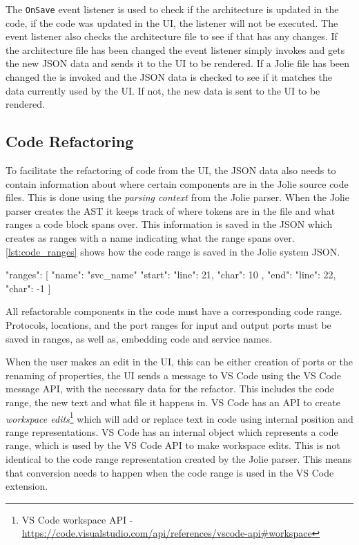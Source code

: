 The \texttt{OnSave} event listener is used to check if the architecture is updated in the code, if the code was updated in the UI, the listener will not be executed. The event listener also checks the architecture file to see if that has any changes.
If the architecture file has been changed the event listener simply invokes \nodetoolname[] and gets the new JSON data and sends it to the UI to be rendered.
If a Jolie file has been changed the \nodetoolname[] is invoked and the JSON data is checked to see if it matches the data currently used by the UI. If not, the new data is sent to the UI to be rendered.

\subsection{Code Refactoring}
To facilitate the refactoring of code from the UI, the JSON data also needs to contain information about where certain components are in the Jolie source code files.
This is done using the \emph{parsing context} from the Jolie parser. When the Jolie parser creates the AST it keeps track of where tokens are in the file and what ranges a code block spans over.
This information is saved in the JSON which \javatoolname[] creates as ranges with a name indicating what the range spans over.
\cref{lst:code_ranges} shows how the code range is saved in the Jolie system JSON.
\clearpage
\begin{jsonlisting}[][caption={JSON representing a code range created by the Jolie parser}, label={lst:code_ranges}]
{
    "ranges": [
        {
            "name": "svc_name"
            "start": {
                "line": 21,
                "char": 10
            },
            "end": {
                "line": 22,
                "char": -1
            }
        }
    ]
}
\end{jsonlisting}

All refactorable components in the code must have a corresponding code range. 
Protocols, locations, and the port ranges for input and output ports must be saved in ranges, as well as, embedding code and service names.

When the user makes an edit in the UI, this can be either creation of ports or the renaming of properties, the UI sends a message to VS Code using the VS Code message API, with the necessary data for the refactor. This includes
the code range, the new text and what file it happens in. VS Code has an API to create \emph{workspace edits}\footnote{VS Code workspace API - \url{https://code.visualstudio.com/api/references/vscode-api\#workspace}} which will add or replace text in code using internal position and range representations.
VS Code has an internal object which represents a code range, which is used by the VS Code API to make workspace edits. This is not identical to the code range representation created by the Jolie parser.
This means that conversion needs to happen when the code range is used in the VS Code extension.

